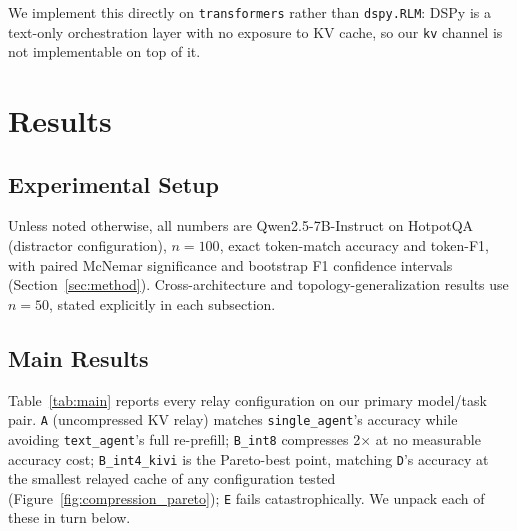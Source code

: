 \documentclass[11pt]{article}
\begin{document}
We implement this directly on \texttt{transformers} \citep{transformers2020}
rather than \texttt{dspy.RLM}: DSPy is a text-only orchestration layer
with no exposure to KV cache, so our \texttt{kv} channel is not
implementable on top of it.

\section{Results}
\label{sec:results}

\subsection{Experimental Setup}
Unless noted otherwise, all numbers are Qwen2.5-7B-Instruct on HotpotQA
(distractor configuration), $n=100$, exact token-match accuracy and token-F1,
with paired McNemar significance and bootstrap F1 confidence intervals
(Section~\ref{sec:method}). Cross-architecture and topology-generalization
results use $n=50$, stated explicitly in each subsection.

\subsection{Main Results}
Table~\ref{tab:main} reports every relay configuration on our primary
model/task pair. \texttt{A} (uncompressed KV relay) matches
\texttt{single\_agent}'s accuracy while avoiding \texttt{text\_agent}'s
full re-prefill; \texttt{B\_int8} compresses 2$\times$ at no measurable
accuracy cost; \texttt{B\_int4\_kivi} is the Pareto-best point, matching
\texttt{D}'s accuracy at the smallest relayed cache of any configuration
tested (Figure~\ref{fig:compression_pareto}); \texttt{E} fails
catastrophically. We unpack each of these in turn below.
\end{document}
